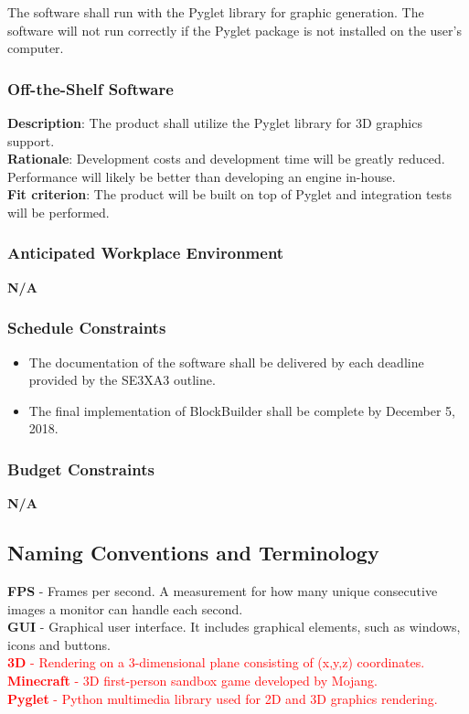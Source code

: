 \documentclass[12pt, titlepage]{article}
\begin{document}
The software shall run with the Pyglet library for graphic generation. The software will not run correctly if the Pyglet package is not installed on the user's computer.

\subsubsection{Off-the-Shelf Software}

\textbf{Description}: The product shall utilize the Pyglet library for 3D graphics support.\\
\textbf{Rationale}: Development costs and development time will be greatly reduced. Performance will likely be better than developing an engine in-house.\\
\textbf{Fit criterion}: The product will be built on top of Pyglet and integration tests will be performed.

\subsubsection{Anticipated Workplace Environment}
\textbf{N/A}
\subsubsection{Schedule Constraints}

\begin{itemize}
    \item The documentation of the software shall be delivered by each deadline provided by the SE3XA3 outline.
    \item The final implementation of BlockBuilder shall be complete by December 5, 2018.
\end{itemize}

\subsubsection{Budget Constraints}
\textbf{N/A}

\subsection{Naming Conventions and Terminology}
\textbf{FPS} - Frames per second. A measurement for how many unique consecutive images a monitor can handle each second.\\
\textbf{GUI} - Graphical user interface. It includes graphical elements, such as windows, icons and buttons.\\
\textcolor{red}{\textbf{3D} - Rendering on a 3-dimensional plane consisting of (x,y,z) coordinates.}\\
\textcolor{red}{\textbf{Minecraft} - 3D first-person sandbox game developed by Mojang.}\\
\textcolor{red}{\textbf{Pyglet} - Python multimedia library used for 2D and 3D graphics rendering.}\\
\end{document}
